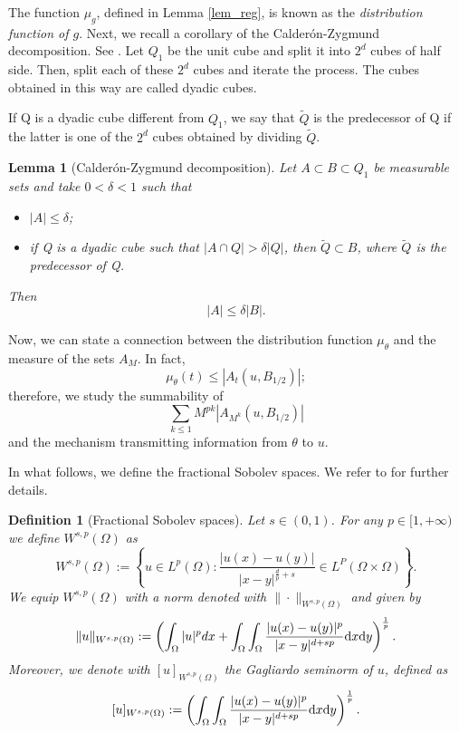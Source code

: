 \documentclass[10pt]{article} %
\newtheorem{Definition}{Definition}
\newtheorem{Lemma}{Lemma}
\begin{document}
The function $\mu_g$, defined in Lemma \ref{lem_reg}, is known as the \emph{distribution function of $g$}. Next, we recall a corollary of the Calder\'on-Zygmund decomposition. See \cite[Lemma 4.2]{cafcab}. Let $Q_1$ be the unit cube and split it into $2^d$ cubes of half side. Then, split each of these $2^d$ cubes and iterate the process. The cubes obtained in this way are called dyadic cubes.

If Q is a dyadic cube different from $Q_1$, we say that $\tilde{Q}$ is the predecessor of Q if the latter is one of the $2^d$ cubes obtained by dividing $\tilde{Q}$.

\begin{Lemma}[Calder\'on-Zygmund decomposition]\label{lem_cald}
Let $A \subset B \subset Q_1$ be measurable sets and take $0<\delta<1$ such that
\begin{itemize}
\item[(a)] $|A| \leq \delta$;
\item[(b)] if Q is a dyadic cube such that $|A\cap Q| > \delta|Q|$, then $\widetilde{Q} \subset B$, where $\widetilde{Q}$ is the predecessor of Q.
\end{itemize}
Then
\[
|A| \leq \delta|B|.
\]
\end{Lemma}

Now, we can state a connection between the distribution function $\mu_\theta$ and the measure of the sets $A_M$. In fact,
\[
\mu_{\theta}(t) \leq |A_t(u,B_{1/2})|;
\]
therefore, we study the summability of
\[
\sum_{k\leq 1}M^{pk}|A_{M^k}(u,B_{1/2})|
\]
and the mechanism transmitting information from $\theta$ to $u$.

In what follows, we define the fractional Sobolev spaces. We refer to \cite[Chapter 2]{Nezza-Palatucci-Valdinoci2012} for further details. 

\begin{Definition}[Fractional Sobolev spaces]\label{def_fracsob1}
Let $s \in (0,1)$. For any $p \in [1, +\infty)$ we define $W^{s,p}(\Omega)$ as
\[
W^{s,p}(\Omega) := \left\{u \in L^p(\Omega) : \frac{|u(x)-u(y)|}{|x-y|^{\frac{d}{p} + s}} \in L^P(\Omega\times\Omega)\right\}.
\]
We equip $W^{s,p}(\Omega)$ with a norm denoted with $\|\cdot\|_{W^{s,p}(\Omega)}$ and given by
\[
\|u\|_{W^{s,p}(\Omega)} := \left(\int_{\Omega}|u|^pdx + \int_\Omega\int_\Omega \frac{|u(x) - u(y)|^p}{|x-y|^{d+sp}}{\rm d}x{\rm d}y \right)^{\frac{1}{p}}.
\]
Moreover, we denote with $[u]_{W^{s,p}(\Omega)}$ the Gagliardo seminorm of $u$, defined as
\[
[u]_{W^{s,p}(\Omega)} := \left( \int_\Omega\int_\Omega \frac{|u(x) - u(y)|^p}{|x-y|^{d+sp}}{\rm d}x{\rm d}y \right)^{\frac{1}{p}}.
\]
\end{Definition}
\end{document}
